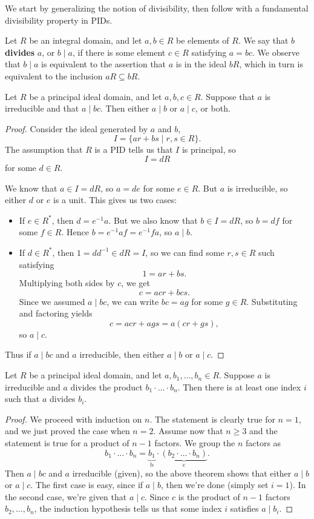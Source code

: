\documentclass[math1530-lecture-notes]{subfiles}
\begin{document}
We start by generalizing the notion of divisibility, then follow with a fundamental divisibility
property in PIDs.
\begin{definition}[Divisibility]{}
  Let $R$ be an integral domain, and let $a,b\in R$ be elements of $R$. We say that $b$
  \textbf{divides} $a$, or $b\mid a$, if there is some element $c\in R$ satisfying $a=bc$. We
  observe that $b\mid a$ is equivalent to the assertion that $a$ is in the ideal $bR$, which in turn
  is equivalent to the inclusion $aR\subseteq bR$.
\end{definition}
\begin{proposition}{}
  Let $R$ be a principal ideal domain, and let $a,b,c\in R$. Suppose that $a$ is irreducible and
  that $a\mid bc$. Then either $a\mid b$ or $a\mid c$, or both.
\end{proposition}
\begin{proof}[Proof]
  Consider the ideal generated by $a$ and $b$, \[
    I=\{ar+bs\mid r,s \in R\} 
  .\] The assumption that $R$ is a PID tells us that $I$ is principal, so \[
    I=dR
  \] for some $d\in R$.

  We know that $a\in I=dR$, so $a=de$ for some $e\in R$. But $a$ is irreducible, so either $d$ or
  $e$ is a unit. This gives us two cases:
  \begin{itemize}
    \item If $e\in R^*$, then $d=e^{-1}a$. But we also know that $b\in I=dR$, so $b=df$ for some
      $f\in R$. Hence $b=e^{-1}af=e^{-1}fa$, so $a\mid b$.
    \item If $d\in R^*$, then $1=dd^{-1}\in dR=I$, so we can find some $r,s \in R$ such satisfying
      \[
        1=ar+bs
      .\] Multiplying both sides by $c$, we get \[
        c= acr+bcs
      .\] Since we assumed $a\mid bc$, we can write $bc=ag$ for some $g\in R$. Substituting and
      factoring yields \[
        c=acr+ags=a(cr+gs)
      ,\] so $a\mid c$.
  \end{itemize}
  Thus if $a\mid bc$ and $a$ irreducible, then either $a\mid b$ or $a\mid c$.
\end{proof}
\begin{corollary}{}
  Let $R$ be a principal ideal domain, and let $a,b_1,\ldots,b_n\in R$. Suppose $a$ is irreducible
  and $a$ divides the product $b_1\cdot \ldots\cdot b_n$. Then there is at least one index $i$ such
  that $a$ divides $b_i$.
\end{corollary}
\begin{proof}[Proof]
  We proceed with induction on $n$. The statement is clearly true for $n=1$, and we just proved the
  case when $n=2$. Assume now that $n\ge 3$ and the statement is true for a product of $n-1$
  factors. We group the $n$ factors as \[
    b_1\cdot \ldots\cdot b_n=\underbrace{b_1}_\text{b}\cdot \underbrace{(b_2\cdot \ldots\cdot
    b_n)}_\text{c}
  .\] Then $a\mid bc$ and $a$ irreducible (given), so the above theorem shows that either $a\mid b$
  or $a\mid c$. The first case is easy, since if $a\mid b$, then we're done (simply set $i=1$). In
  the second case, we're given that $a\mid c$. Since $c$ is the product of $n-1$ factors
  $b_2,\ldots,b_n$, the induction hypothesis tells us that some index $i$ satisfies $a\mid b_i$.
\end{proof}
\end{document}
